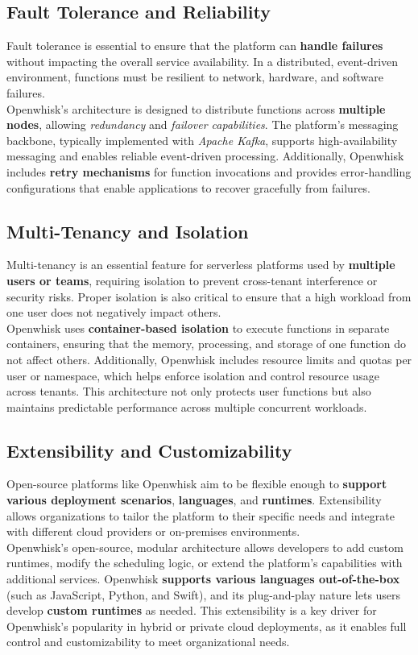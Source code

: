\subsection{Fault Tolerance and Reliability}
Fault tolerance is essential to ensure that the platform can \textbf{handle failures} without impacting the overall service availability. In a distributed, event-driven environment, functions must be resilient to network, hardware, and software failures.\vspace{14pt}\\
Openwhisk’s architecture is designed to distribute functions across \textbf{multiple nodes}, allowing \textit{redundancy} and \textit{failover capabilities}. The platform’s messaging backbone, typically implemented with \textit{Apache Kafka}, supports high-availability messaging and enables reliable event-driven processing. Additionally, Openwhisk includes \textbf{retry mechanisms} for function invocations and provides error-handling configurations that enable applications to recover gracefully from failures.
\subsection{Multi-Tenancy and Isolation}
Multi-tenancy is an essential feature for serverless platforms used by \textbf{multiple users or teams}, requiring isolation to prevent cross-tenant interference or security risks. Proper isolation is also critical to ensure that a high workload from one user does not negatively impact others.\vspace{14pt}\\
Openwhisk uses \textbf{container-based isolation} to execute functions in separate containers, ensuring that the memory, processing, and storage of one function do not affect others. Additionally, Openwhisk includes resource limits and quotas per user or namespace, which helps enforce isolation and control resource usage across tenants. This architecture not only protects user functions but also maintains predictable performance across multiple concurrent workloads.
\subsection{Extensibility and Customizability}
Open-source platforms like Openwhisk aim to be flexible enough to \textbf{support various deployment scenarios}, \textbf{languages}, and \textbf{runtimes}. Extensibility allows organizations to tailor the platform to their specific needs and integrate with different cloud providers or on-premises environments.\vspace{14pt}\\
Openwhisk’s open-source, modular architecture allows developers to add custom runtimes, modify the scheduling logic, or extend the platform’s capabilities with additional services. Openwhisk \textbf{supports various languages out-of-the-box} (such as JavaScript, Python, and Swift), and its plug-and-play nature lets users develop \textbf{custom runtimes} as needed. This extensibility is a key driver for Openwhisk’s popularity in hybrid or private cloud deployments, as it enables full control and customizability to meet organizational needs.
